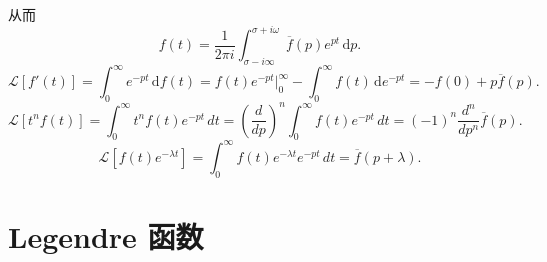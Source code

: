 \documentclass[12pt,a4paper,openany,twoside]{book}
\numberwithin{equation}{section}
\begin{document}
        从而
        \begin{equation}
          f(t) = \frac{1}{2\pi i} \int ^{\sigma + i \omega} _{\sigma - i \infty} \overline{f}(p) e^{p t} \, \mathrm{d}p 
        .
        \end{equation} 
        \begin{equation}
          \mathcal{L}[f'(t)] = \int ^\infty _0 e^{-pt} \, \mathrm{d}f(t) = f(t)e^{-pt} \bigg|^\infty_0 - \int ^\infty_0 f(t) \, \mathrm{d}e^{-pt} = -f(0) + p \overline{f}(p)   
        .
        \end{equation}
        \begin{equation}
          \mathcal{L}[t^n f(t)] = \int _0^\infty t^n f(t) e^{-pt} \, dt = \left( \frac{d }{d p}  \right) ^n \int_0 ^\infty f(t) e^{-pt} \, dt = (-1)^n \frac{d ^n}{d p^n} \overline{f}(p)  
        .
        \end{equation}
        \begin{equation}
          \mathcal{L}[f(t)e^{-\lambda t}] = \int _0^\infty f(t) e^{-\lambda t}  e^{-pt}\, dt = \overline{f}(p+\lambda) 
        .
        \end{equation} 

      \section{Legendre 函数}
\end{document}

